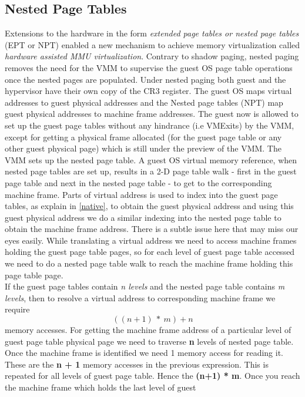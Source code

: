\subsection{Nested Page Tables} \label{nested}
Extensions to the hardware in the form \textit{extended page tables or nested page tables} (EPT or
NPT) enabled a new mechanism to achieve memory virtualization called \textit{hardware assisted MMU
virtualization}. Contrary to shadow paging, nested paging removes the need for the VMM to
supervise the guest OS page table operations once the nested pages are populated. Under nested
paging both guest and the hypervisor have their own copy of the CR3 register. The guest OS maps
virtual addresses to guest physical addresses and the Nested page tables (NPT) map guest physical
addresses to machine frame addresses. The guest now is allowed to set up the guest page tables
without any hindrance (i.e VMExits) by the VMM, except for getting a physical frame allocated (for
the guest page table or any other guest physical page) which is still under the preview of the
VMM. The VMM sets up the nested page table. A guest OS virtual memory reference, when nested page
tables are set up, results in a 2-D page table walk - first in the guest page table and next in
the nested page table - to get to the corresponding machine frame. Parts of virtual address is
used to index into the guest page tables, as explain in \ref{native}, to obtain the guest physical
address and using this guest physical address we do a similar indexing into the nested page table
to obtain the machine frame address. There is a subtle issue here that may miss our eyes easily.
While translating a virtual address we need to access machine frames holding the guest page table
pages, so for each level of guest page table accessed we need to do a nested page table walk to
reach the machine frame holding this page table page.\\
If the guest page tables contain \textit{n levels} and the nested page table contains \textit{m
levels}, then to resolve a virtual address to corresponding machine frame we require \[((n+1)\ *\
m) + n\] memory accesses. For getting the machine frame address of a particular level of guest
page table physical page we need to traverse \textbf{n} levels of nested page table. Once the
machine frame is identified we need 1 memory access for reading it. These are the \textbf{n + 1}
memory accesses in the previous expression. This is repeated for all levels of guest page table.
Hence the \textbf{(n+1) * m}. Once you reach the machine frame which holds the last level of guest
